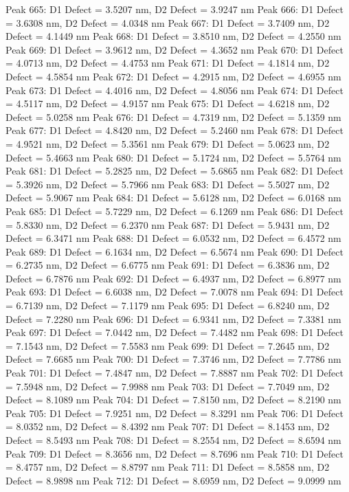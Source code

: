 \documentclass{article}
\begin{document}
Peak 665: D1 Defect = 3.5207 nm, D2 Defect = 3.9247 nm
Peak 666: D1 Defect = 3.6308 nm, D2 Defect = 4.0348 nm
Peak 667: D1 Defect = 3.7409 nm, D2 Defect = 4.1449 nm
Peak 668: D1 Defect = 3.8510 nm, D2 Defect = 4.2550 nm
Peak 669: D1 Defect = 3.9612 nm, D2 Defect = 4.3652 nm
Peak 670: D1 Defect = 4.0713 nm, D2 Defect = 4.4753 nm
Peak 671: D1 Defect = 4.1814 nm, D2 Defect = 4.5854 nm
Peak 672: D1 Defect = 4.2915 nm, D2 Defect = 4.6955 nm
Peak 673: D1 Defect = 4.4016 nm, D2 Defect = 4.8056 nm
Peak 674: D1 Defect = 4.5117 nm, D2 Defect = 4.9157 nm
Peak 675: D1 Defect = 4.6218 nm, D2 Defect = 5.0258 nm
Peak 676: D1 Defect = 4.7319 nm, D2 Defect = 5.1359 nm
Peak 677: D1 Defect = 4.8420 nm, D2 Defect = 5.2460 nm
Peak 678: D1 Defect = 4.9521 nm, D2 Defect = 5.3561 nm
Peak 679: D1 Defect = 5.0623 nm, D2 Defect = 5.4663 nm
Peak 680: D1 Defect = 5.1724 nm, D2 Defect = 5.5764 nm
Peak 681: D1 Defect = 5.2825 nm, D2 Defect = 5.6865 nm
Peak 682: D1 Defect = 5.3926 nm, D2 Defect = 5.7966 nm
Peak 683: D1 Defect = 5.5027 nm, D2 Defect = 5.9067 nm
Peak 684: D1 Defect = 5.6128 nm, D2 Defect = 6.0168 nm
Peak 685: D1 Defect = 5.7229 nm, D2 Defect = 6.1269 nm
Peak 686: D1 Defect = 5.8330 nm, D2 Defect = 6.2370 nm
Peak 687: D1 Defect = 5.9431 nm, D2 Defect = 6.3471 nm
Peak 688: D1 Defect = 6.0532 nm, D2 Defect = 6.4572 nm
Peak 689: D1 Defect = 6.1634 nm, D2 Defect = 6.5674 nm
Peak 690: D1 Defect = 6.2735 nm, D2 Defect = 6.6775 nm
Peak 691: D1 Defect = 6.3836 nm, D2 Defect = 6.7876 nm
Peak 692: D1 Defect = 6.4937 nm, D2 Defect = 6.8977 nm
Peak 693: D1 Defect = 6.6038 nm, D2 Defect = 7.0078 nm
Peak 694: D1 Defect = 6.7139 nm, D2 Defect = 7.1179 nm
Peak 695: D1 Defect = 6.8240 nm, D2 Defect = 7.2280 nm
Peak 696: D1 Defect = 6.9341 nm, D2 Defect = 7.3381 nm
Peak 697: D1 Defect = 7.0442 nm, D2 Defect = 7.4482 nm
Peak 698: D1 Defect = 7.1543 nm, D2 Defect = 7.5583 nm
Peak 699: D1 Defect = 7.2645 nm, D2 Defect = 7.6685 nm
Peak 700: D1 Defect = 7.3746 nm, D2 Defect = 7.7786 nm
Peak 701: D1 Defect = 7.4847 nm, D2 Defect = 7.8887 nm
Peak 702: D1 Defect = 7.5948 nm, D2 Defect = 7.9988 nm
Peak 703: D1 Defect = 7.7049 nm, D2 Defect = 8.1089 nm
Peak 704: D1 Defect = 7.8150 nm, D2 Defect = 8.2190 nm
Peak 705: D1 Defect = 7.9251 nm, D2 Defect = 8.3291 nm
Peak 706: D1 Defect = 8.0352 nm, D2 Defect = 8.4392 nm
Peak 707: D1 Defect = 8.1453 nm, D2 Defect = 8.5493 nm
Peak 708: D1 Defect = 8.2554 nm, D2 Defect = 8.6594 nm
Peak 709: D1 Defect = 8.3656 nm, D2 Defect = 8.7696 nm
Peak 710: D1 Defect = 8.4757 nm, D2 Defect = 8.8797 nm
Peak 711: D1 Defect = 8.5858 nm, D2 Defect = 8.9898 nm
Peak 712: D1 Defect = 8.6959 nm, D2 Defect = 9.0999 nm
\end{document}
